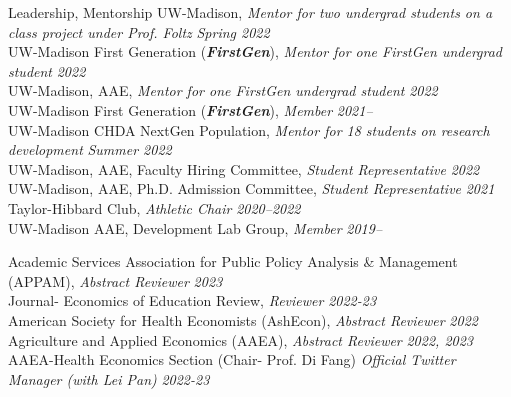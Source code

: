 \documentclass{resume} %
\begin{document}
\begin{rSection}{Leadership, Mentorship}%
UW-Madison, \textit{Mentor for two undergrad students on a class project under Prof. Foltz} {\hfill\textit{Spring 2022}}\\ 
UW-Madison First Generation (\textbf{\textit{FirstGen}}), \textit{Mentor for one FirstGen undergrad student} {\hfill\textit{2022}}\\
UW-Madison, AAE, \textit{Mentor for one FirstGen undergrad student} {\hfill\textit{2022}}\\
UW-Madison First Generation (\textbf{\textit{FirstGen}}), \textit{Member} {\hfill\textit{ 2021--}}\\
UW-Madison CHDA NextGen Population, \textit{Mentor for 18 students on research development} {\hfill\textit{ Summer 2022}}\\
UW-Madison, AAE, Faculty Hiring Committee, \textit{Student Representative} {\hfill \textit{2022}}\\
UW-Madison, AAE, Ph.D. Admission Committee, \textit{Student Representative} {\hfill \textit{2021}}\\
Taylor-Hibbard Club, \textit{Athletic Chair} {\hfill \textit{2020--2022}} \\
UW-Madison AAE, Development Lab Group, \textit{Member} {\hfill \textit{2019--}}
\end{rSection}



\begin{rSection}{Academic Services}%
Association for Public Policy Analysis \& Management (APPAM),  \textit{Abstract Reviewer}  {\hfill \em 2023} \\
Journal- Economics of Education Review, \textit{Reviewer} {\hfill\textit{2022-23}} \\ 
American Society for Health Economists (AshEcon), \textit{Abstract Reviewer} {\hfill\textit{2022}} \\ 
Agriculture and Applied Economics (AAEA), \textit{Abstract Reviewer} {\hfill \textit{2022, 2023}}\\
AAEA-Health Economics Section (Chair- Prof. Di Fang) \textit{Official Twitter Manager (with Lei Pan)} {\hfill \textit{2022-23}}  
\end{rSection}
\end{document}
